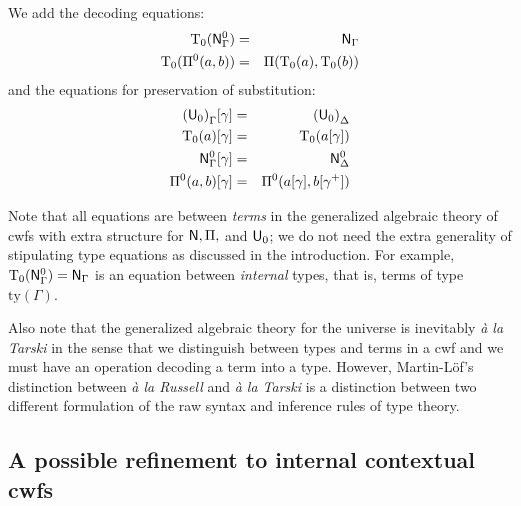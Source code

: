 \documentclass{lmcs}
\newcommand{\Ta}{\mathrm{T}}
\newcommand{\ty}{\mathrm{ty}}
\begin{document}
We add the decoding equations:
\begin{eqnarray*}
\Ta_0(\N^0_\Gamma) &=& \N_\Gamma\\
\Ta_0(\Pi^0(a,b)) &=& \Pi(\Ta_0(a),\Ta_0(b))
\end{eqnarray*}
and the equations for preservation of substitution:
\begin{eqnarray*}
{(\U_0)}_\Gamma [ \gamma ] &=& {(\U_0)}_\Delta\\
\Ta_0(a) [ \gamma ] &=& \Ta_0(a[ \gamma ] )\\
\N^0_\Gamma [ \gamma ] &=&\N^0_\Delta\\
\Pi^0(a,b)[ \gamma ] &=& \Pi^0(a [ \gamma ], b[ \gamma^+ ])
\end{eqnarray*}

\begin{remark}\label{remark:typeequations}
Note that all equations are between {\em terms} in the generalized algebraic theory of cwfs with extra structure for $\mathsf{N}, \Pi,$ and $\mathsf{U}_0$; we do not need the extra generality of stipulating type equations as discussed in the introduction. For example, $\Ta_0(\N^0_\Gamma) = \N_\Gamma$ is an equation between {\em internal} types, that is, terms of type $\ty(\Gamma)$.
\end{remark}

\begin{remark}
Also note that the generalized algebraic theory for the universe is inevitably {\em \`a la Tarski} in the sense that we distinguish between types and terms in a cwf and we must have an operation decoding a term into a type. However, Martin-Löf's distinction between {\em \`a la Russell} and {\em \`a la Tarski} \cite{martinlof:padova} is a distinction between two different formulation of the raw syntax and inference rules of type theory.
\end{remark}

\subsection{A possible refinement to internal contextual cwfs}
\end{document}
